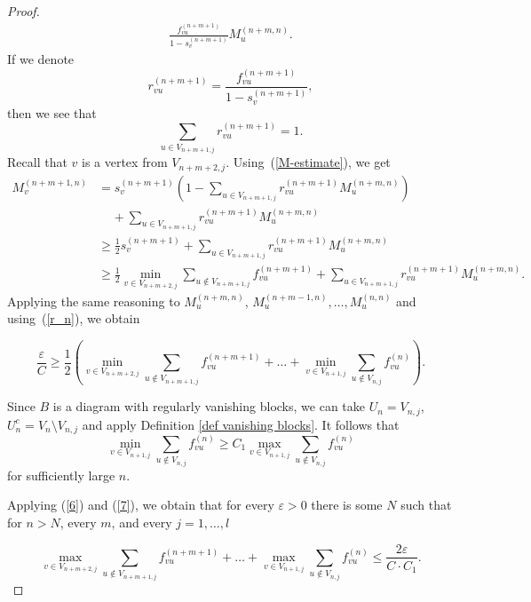 \documentclass[11pt, english, reqno]{amsart}
\theoremstyle{definition}
\theoremstyle{remark}
\theoremstyle{plain}
\numberwithin{equation}{section}
\begin{document}
{\begin{proof}
\begin{eqnarray*}
\frac{f_{vu}^{(n+m+1)}}{1 - s_v^{(n+m+1)}} M_u^{(n+m, n)}.
\end{eqnarray*}
If we denote
$$
r_{vu}^{(n+m+1)} = \frac{f_{vu}^{(n+m+1)}}{1 - s_v^{(n+m+1)}},
$$
then we see that
\begin{equation}\label{r_n}
\sum_{u \in V_{n+m+1,j}}r_{vu}^{(n+m+1)} = 1.
\end{equation}
Recall that $v$ is a vertex from $V_{n+m+2,j}$.
Using~(\ref{M-estimate}), we get
$$
\begin{aligned}
M_v^{(n+m+1, n)} & = s_v^{(n+m+1)} \left(1 -  \sum_{u \in V_{n+m+1,j}}
r_{vu}^{(n+m+1)}M_u^{(n+m, n)}\right) \\
& \ \ \  \ \ + \sum_{u \in V_{n+m+1,j}}
r_{vu}^{(n+m+1)}M_u^{(n+m, n)}\\
& \geq \frac{1}{2}s_v^{(n+m+1)} + \sum_{u \in
V_{n+m+1,j}}r_{vu}^{(n+m+1)}M_u^{(n+m, n)}\\
& \geq \frac{1}{2}\min_{v\in V_{n+m+2,j}} \sum_{u \notin V_{n+m+1,j}}
f_{vu}^{(n+m+1)}  + \sum_{u \in V_{n+m+1,j}}r_{vu}^{(n+m+1)}
M_u^{(n+m, n)}.
\end{aligned}
$$
Applying the same reasoning to $M_u^{(n+m, n)}$, $M_u^{(n+m-1, n)},
\ldots, M_u^{(n, n)}$ and using~(\ref{r_n}), we obtain

\begin{equation}\label{6}
\frac{\varepsilon}{C} \geq \frac{1}{2} \left(\min_{v\in V_{n+m+2,j}}
\sum_{u \notin V_{n+m+1,j}} f_{vu}^{(n+m+1)} + \ldots + \min_{v\in V_{n+1,j}} \sum_{u \notin V_{n,j}} f_{vu}^{(n)}
\right).
\end{equation}

Since $B$ is a diagram with regularly vanishing blocks, we can take $U_n =
V_{n,j}$, $U_n^c = V_n \setminus V_{n,j}$ and apply Definition
\ref{def vanishing blocks}.  It follows that
\begin{equation}\label{7}
\min_{v\in V_{n+1,j}} \sum_{u \notin V_{n,j}} f_{vu}^{(n)} \geq C_1
\max_{v\in V_{n+1,j}} \sum_{u \notin V_{n,j}} f_{vu}^{(n)}
\end{equation}
for sufficiently large $n$.

Applying (\ref{6}) and (\ref{7}), we obtain that for every $\varepsilon >
0$ there is some $N$ such that for  $n>N$, every $m$, and every $j = 1,
\ldots,l$

\begin{equation*}
\max_{v\in V_{n+m+2,j}} \sum_{u \notin V_{n+m+1,j}}
f_{vu}^{(n+m+1)} + \ldots + \max_{v\in V_{n+1,j}} \sum_{u \notin V_{n,j}} f_{vu}^{(n)} \leq \frac{2
\varepsilon}{C\cdot C_1}.
\end{equation*}


\end{proof}}
\end{document}
